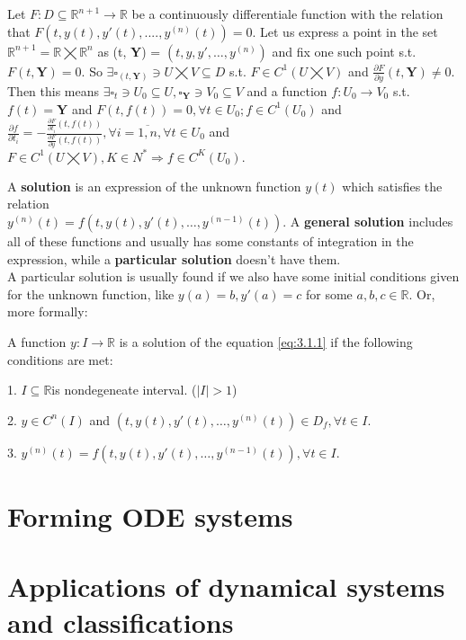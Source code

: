 \begin{theorem}
    Let $F:D \subseteq \mathbb{R}^{n+1}\rightarrow\mathbb{R}$ be a continuously differentiale function with the relation that $F(t,y(t),y'(t),....,y^{(n)}(t))=0$. Let us express a point in the set $\mathbb{R}^{n+1} =\mathbb{R}\bigtimes\mathbb{R}^n$ as (t, \textbf{Y}) = $(t, y,y', \dots, y^{ (n) })$ and fix one such point s.t. $F(t, \textbf{Y})=0$.
    So $\exists \square_{(t, \textbf{Y})} \ni U \bigtimes V \subseteq D$ s.t. $F \in C^1(U\bigtimes V)$ and $\frac{\partial F}{\partial y}(t, \textbf{Y}) \neq 0.$ Then this means $ \exists \square_{t} \ni U_0 \subseteq U,
        \square_{\textbf{Y}} \ni V_0 \subseteq V$ and a function $f : U_0 \rightarrow V_0$ s.t. $f(t) = \textbf{Y}$ and $F(t,f(t))=0, \forall t \in U_0; f \in C^1(U_0)$ and $\frac{\partial f}{\partial t_i} = - \frac{\frac{\partial F}{\partial t_i}(t,f(t))}{\frac{\partial F}{\partial y}(t,f(t))}, \forall i = \overline{1,n} , \forall t \in U_0$ and $F \in C^1(U \bigtimes V),K \in N^* \Rightarrow f \in C^K(U_0).$
\end{theorem}

A \textbf{solution} is an expression of the unknown function $y(t)$ which satisfies the relation \\
$y^{(n)}(t) = f(t,y(t),y'(t),\dots,y^{(n-1)}(t))$. A \textbf{general solution} includes all of these functions and usually has some constants of integration in the expression, while a \textbf{particular solution} doesn't have them. \\
A particular solution is usually found if we also have some initial conditions given for the unknown function, like $y(a)=b, y'(a)=c$ for some $a,b,c  \in \mathbb{R}$.
Or, more formally:

\begin{definition}
    A function $y:I \rightarrow \mathbb{R}$ is a solution of the equation \ref{eq:3.1.1} if the following conditions are met:

    1. $I \subseteq \mathbb{R}$is nondegeneate interval. ($|I|>1$)

    2. $y \in C^n(I)$ and $(t,y(t), y'(t), \dots, y^{(n)}(t)) \in D_f, \forall t \in I$.

    3. $y^{(n)}(t)= f(t,y(t),y'(t),\dots,y^(n-1)(t)), \forall t \in I$.

\end{definition}


\section{Forming ODE systems}


\section{Applications of dynamical systems and classifications}
